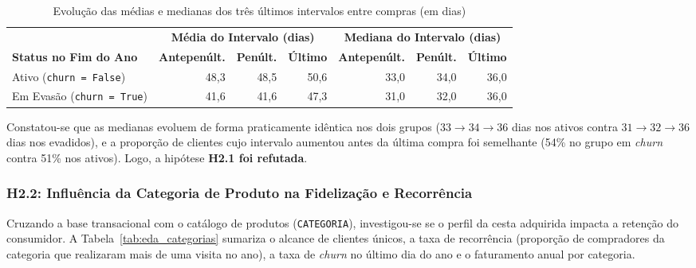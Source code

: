 \begin{table}[H]
\centering
\caption{Evolução das médias e medianas dos três últimos intervalos entre compras (em dias)}
\label{tab:eda_intervalos}
\begin{tabular}{lrrrrrr}
\toprule
& \multicolumn{3}{c}{\textbf{Média do Intervalo (dias)}} & \multicolumn{3}{c}{\textbf{Mediana do Intervalo (dias)}} \\
\cmidrule(lr){2-4} \cmidrule(lr){5-7}
\textbf{Status no Fim do Ano} & \textbf{Antepenúlt.} & \textbf{Penúlt.} & \textbf{Último} & \textbf{Antepenúlt.} & \textbf{Penúlt.} & \textbf{Último} \\
\midrule
Ativo (\texttt{churn = False}) & 48,3 & 48,5 & 50,6 & 33,0 & 34,0 & 36,0 \\
Em Evasão (\texttt{churn = True}) & 41,6 & 41,6 & 47,3 & 31,0 & 32,0 & 36,0 \\
\bottomrule
\end{tabular}
\end{table}

Constatou-se que as medianas evoluem de forma praticamente idêntica nos dois grupos ($33 \rightarrow 34 \rightarrow 36$ dias nos ativos contra $31 \rightarrow 32 \rightarrow 36$ dias nos evadidos), e a proporção de clientes cujo intervalo aumentou antes da última compra foi semelhante (54\% no grupo em \textit{churn} contra 51\% nos ativos). 
Logo, a hipótese \textbf{H2.1 foi refutada}.

\subsubsection{H2.2: Influência da Categoria de Produto na Fidelização e Recorrência}
Cruzando a base transacional com o catálogo de produtos (\texttt{CATEGORIA}), investigou-se se o perfil da cesta adquirida impacta a retenção do consumidor. 
A Tabela~\ref{tab:eda_categorias} sumariza o alcance de clientes únicos, a taxa de recorrência (proporção de compradores da categoria que realizaram mais de uma visita no ano), a taxa de \textit{churn} no último dia do ano e o faturamento anual por categoria.

